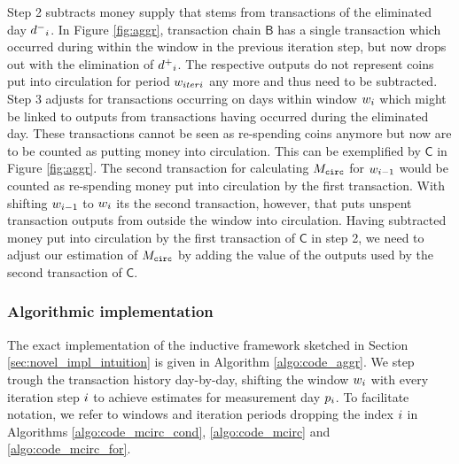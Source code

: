 Step 2 subtracts money supply that stems from transactions of the eliminated day \({d^{-}}_{{i}}\). %
In Figure \ref{fig:aggr}, transaction chain \(\mathsf{B}\) has a single transaction which occurred during within the window in the previous iteration step, but now drops out with the elimination of \({d^{+}}_{{i}}\). %
The respective outputs do not represent coins put into circulation for period \({w}_{iteri}\) any more and thus need to be subtracted. %
Step 3 adjusts for transactions occurring on days within window \({w}_{i}\) which might be linked to outputs from transactions having occurred during the eliminated day. %
These transactions cannot be seen as re-spending coins anymore but now are to be counted as putting money into circulation. %
This can be exemplified by \(\mathsf{C}\) in Figure \ref{fig:aggr}. %
The second transaction for calculating \({M_{\mathtt{circ}}}\) for \({w}_{{i}-1}\) would be counted as re-spending money put into circulation by the first transaction. %
With shifting \({w}_{{i}-1}\) to \({w}_{{i}}\) its the second transaction, however, that puts unspent transaction outputs from outside the window into circulation. %
Having subtracted money put into circulation by the first transaction of \(\mathsf{C}\) in step 2, we need to adjust our estimation of \({M_{\mathtt{circ}}}\) by adding the value of the outputs used by the second transaction of \(\mathsf{C}\). %



\subsubsection{Algorithmic implementation}
\label{sec:novel_impl_algo}%
The exact implementation of the inductive framework sketched in Section \ref{sec:novel_impl_intuition} is given in Algorithm \ref{algo:code_aggr}. %
We step trough the transaction history day-by-day, shifting the window \({w}_{{i}}\) with every iteration step \({i}\) to achieve estimates for measurement day \({p}_{{i}}\). %
To facilitate notation, we refer to windows and iteration periods dropping the index \({i}\) in Algorithms \ref{algo:code_mcirc_cond}, \ref{algo:code_mcirc} and \ref{algo:code_mcirc_for}. %

